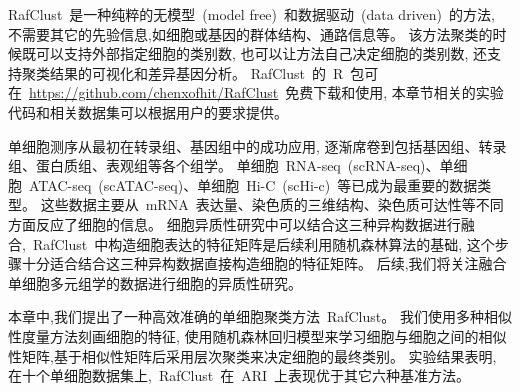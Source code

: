 RafClust~是一种纯粹的无模型~(model free)~和数据驱动~(data driven)~的方法,
不需要其它的先验信息,如细胞或基因的群体结构、通路信息等。
该方法聚类的时候既可以支持外部指定细胞的类别数, 也可以让方法自己决定细胞的类别数,
还支持聚类结果的可视化和差异基因分析。
RafClust~的~R~包可在~\url{https://github.com/chenxofhit/RafClust}~免费下载和使用,
本章节相关的实验代码和相关数据集可以根据用户的要求提供。

单细胞测序从最初在转录组、基因组中的成功应用, 逐渐席卷到包括基因组、转录组、蛋白质组、表观组等各个组学。
单细胞~RNA-seq~(scRNA-seq)、单细胞~ATAC-seq~(scATAC-seq)、单细胞~Hi-C~(scHi-c)~等已成为最重要的数据类型。
这些数据主要从~mRNA~表达量、染色质的三维结构、染色质可达性等不同方面反应了细胞的信息。
细胞异质性研究中可以结合这三种异构数据进行融合,~RafClust~中构造细胞表达的特征矩阵是后续利用随机森林算法的基础,
这个步骤十分适合结合这三种异构数据直接构造细胞的特征矩阵。
后续,我们将关注融合单细胞多元组学的数据进行细胞的异质性研究。

本章中,我们提出了一种高效准确的单细胞聚类方法~RafClust。
我们使用多种相似性度量方法刻画细胞的特征,
使用随机森林回归模型来学习细胞与细胞之间的相似性矩阵,基于相似性矩阵后采用层次聚类来决定细胞的最终类别。
实验结果表明, 在十个单细胞数据集上,~RafClust~在~ARI~上表现优于其它六种基准方法。


